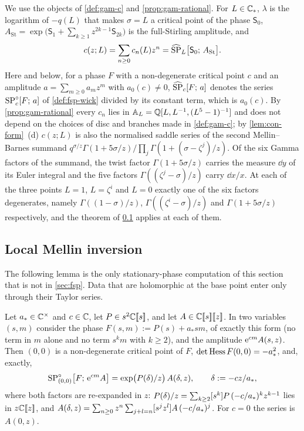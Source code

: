 We use the objects of \cref{def:gam-c} and \cref{prop:gam-rational}. For $L\in\mathbb{C}_{\ast}$, $\lambda$ is the logarithm of $-q(L)$ that makes $\sigma=L$ a critical point of the phase $\mathsf S_0$, $A_{\mathrm{St}}=\exp\bigl(\mathsf S_1+\sum_{k\geq 1}z^{2k-1}\mathsf S_{2k}\bigr)$ is the full-Stirling amplitude, and
\[
c(z;L)=\sum_{n\geq 0}c_n(L)z^n=\widehat{\mathrm{SP}}_L\bigl[\mathsf S_0;\,A_{\mathrm{St}}\bigr].
\]
Here and below, for a phase $F$ with a non-degenerate critical point $c$ and an amplitude $a=\sum_{m\geq 0}a_mz^m$ with $a_0(c)\neq 0$, $\widehat{\mathrm{SP}}_c[F;\,a]$ denotes the series $\mathrm{SP}^{\circ}_c[F;\,a]$ of \cref{def:fsp-wick} divided by its constant term, which is $a_0(c)$. By \cref{prop:gam-rational} every $c_n$ lies in $\mathbb{A}_{L}=\mathbb{Q}[L,L^{-1},(L^5-1)^{-1}]$ and does not depend on the choices of disc and branches made in \cref{def:gam-c}; by \cref{lem:con-form}~(d) $c(z;L)$ is also the normalised saddle series of the second Mellin--Barnes summand $q^{\sigma/z}\Gamma(1+5\sigma/z)/\prod_j\Gamma(1+(\sigma-\zeta^j)/z)$. Of the six Gamma factors of the summand, the twist factor $\Gamma(1+5\sigma/z)$ carries the measure $\dd y$ of its Euler integral and the five factors $\Gamma((\zeta^j-\sigma)/z)$ carry $\dd x/x$. At each of the three points $L=1$, $L=\zeta^i$ and $L=0$ exactly one of the six factors degenerates, namely $\Gamma((1-\sigma)/z)$, $\Gamma((\zeta^i-\sigma)/z)$ and $\Gamma(1+5\sigma/z)$ respectively, and the theorem of \cref{sec:gam-lmi} applies at each of them.

\subsection{Local Mellin inversion}
\label{sec:gam-lmi}

The following lemma is the only stationary-phase computation of this section that is not in \cref{sec:fsp}. Data that are holomorphic at the base point enter only through their Taylor series.

\begin{lem}
\label{lem:gam-deltasrc}
Let $a_*\in\mathbb{C}^\times$ and $c\in\mathbb{C}$, let $P\in s^2\mathbb{C}[\![ s ]\!]$, and let $A\in\mathbb{C}[\![ s ]\!][\![ z ]\!]$. In two variables $(s,m)$ consider the phase $F(s,m):=P(s)+a_*sm$, of exactly this form (no term in $m$ alone and no term $s^km$ with $k\geq 2$), and the amplitude $\mathrm{e}^{cm}A(s,z)$. Then $(0,0)$ is a non-degenerate critical point of $F$, $\det\operatorname{Hess} F(0,0)=-a_*^2$, and, exactly,
\begin{equation}
\label{eq:gam-deltasrc}
\mathrm{SP}^{\circ}_{(0,0)}\bigl[F;\,\mathrm{e}^{cm}A\bigr]=\exp\bigl(P(\delta)/z\bigr)\,A(\delta,z),\qquad \delta:=-cz/a_*,
\end{equation}
where both factors are re-expanded in $z$: $P(\delta)/z=\sum_{k\geq 2}[s^k]P\,(-c/a_*)^kz^{k-1}$ lies in $z\mathbb{C}[\![ z ]\!]$, and $A(\delta,z)=\sum_{n\geq 0}z^n\sum_{j+l=n}[s^jz^l]A\,(-c/a_*)^j$. For $c=0$ the series is $A(0,z)$.
\end{lem}

